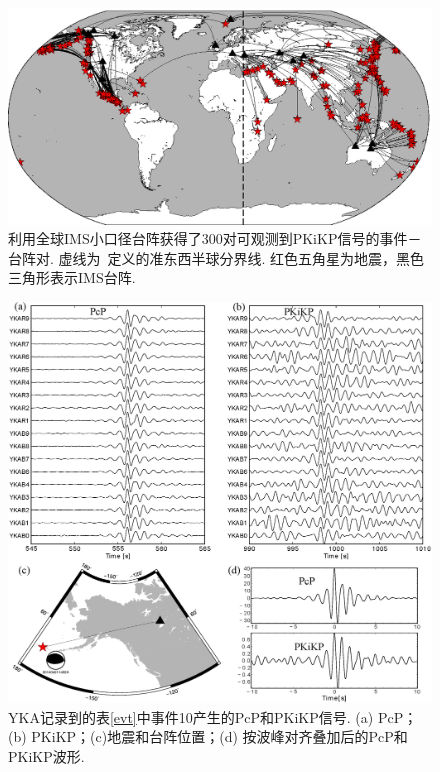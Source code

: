 \begin{figure}
\centering
\includegraphics[width=0.8\linewidth]{fig/chap2/gl_pkikp}
\caption{利用全球IMS小口径台阵获得了300对可观测到PKiKP信号的事件－台阵对. 虚线为~\citet{Tanaka1997}定义的准东西半球分界线. 红色五角星为地震，黑色三角形表示IMS台阵. }
\label{fig:gl_pkikp}
\end{figure}

\begin{figure}
\centering
\includegraphics[width=\linewidth]{fig/chap2/4599655_yka}
\caption{YKA记录到的表\ref{evt}中事件10产生的PcP和PKiKP信号. (a) PcP；(b) PKiKP；(c)地震和台阵位置；(d) 按波峰对齐叠加后的PcP和PKiKP波形. }
\label{fig:4599655_yka}
\end{figure}


